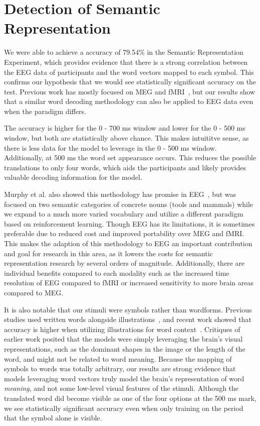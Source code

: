 \section{Detection of Semantic Representation}
\label{sec:discussion:semanticrepresentation}

We were able to achieve a \tvt accuracy of 79.54\% in the Semantic 
Representation Experiment, which provides evidence that there is a strong 
correlation between the EEG data of participants and the word vectors mapped to 
each symbol. This confirms our hypothesis that we would see statistically 
significant accuracy on the \tvt test. Previous work has mostly focused on MEG 
and fMRI~\cite{Mitchell2008,Sudre2012}, but our results show that a similar 
word decoding methodology can also be applied to EEG data even when the 
paradigm differs. 

The accuracy is higher for the 0 - 700 ms window and lower for the 0 - 500 ms 
window, but both are statistically above chance. This makes intuititve sense, 
as there is less data for the model to leverage in the 0 - 500 ms window.  
Additionally, at 500 ms the word set appearance occurs. This reduces the 
possible translations to only four words, which aids the participants and 
likely provides valuable decoding information for the model.

Murphy et al. also showed this methodology has promise in 
EEG~\cite{Murphy2009}, but was focused on two semantic categories of concrete 
nouns (tools and mammals) while we expand to a much more varied vocabulary and 
utilize a different paradigm based on reinforcement learning. Though EEG has 
its limitations, it is sometimes preferable due to reduced cost and improved 
portability over MEG and fMRI. This makes the adaption of this methodology to 
EEG an important contribution and goal for research in this area, as it lowers 
the costs for semantic representation research by several orders of magnitude.  
Additionally, there are individual benefits compared to each modality such as 
the increased time resolution of EEG compared to fMRI or increased sensitivity 
to more brain areas compared to MEG.

It is also notable that our stimuli were symbols rather than wordforms. 
Previous studies used written words alongside 
illustrations~\cite{Mitchell2008,Sudre2012}, and recent work showed that 
accuracy is higher when utilizing illustrations for word 
context~\cite{pereira2018toward}. Critiques of earlier work posited that the 
models were simply leveraging the brain's visual representations, such as the 
dominant shapes in the image or the length of the word, and might not be 
related to word meaning. Because the mapping of symbols to words was totally 
arbitrary, our results are strong evidence that models leveraging word vectors 
truly model the brain's representation of word \emph{meaning}, and not some 
low-level visual features of the stimuli. Although the translated word did 
become visible as one of the four options at the 500 ms mark, we see 
statistically significant \tvt accuracy even when only training on the period 
that the symbol alone is visible.

